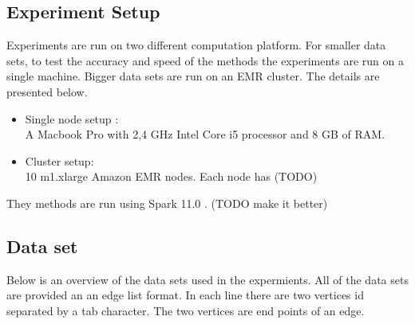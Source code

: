 \documentclass[english]{tktltiki}
\begin{document}
\subsection{Experiment Setup}
Experiments are run on two different computation platform. For smaller data sets, to test the accuracy and speed of the methods the experiments are run on a single machine. Bigger data sets are run on an EMR cluster. The details are presented below. 

\begin{itemize}
\item Single node setup : \\
A Macbook Pro with 2,4 GHz Intel Core i5 processor and 8 GB of RAM. 
\item Cluster setup: \\
10 m1.xlarge Amazon EMR nodes. Each node has (TODO)

\end{itemize}
They methods are run using Spark 11.0 . (TODO make it better)

\subsection{Data set}
Below is an overview of the data sets used in the expermients. All of the data sets are provided an an edge list format. In each line there are two vertices id separated by a tab character. The two vertices are end points of an edge. 
\end{document}
